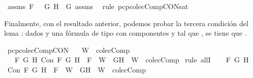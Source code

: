 \begin{isabellebody}
\ assms{\isacharparenleft}{}{\isacharparenright}\ {\isacartoucheopen}F\ {\isacharequal}\ \isactrlbold {\isasymnot}{\isacharparenleft}\isactrlbold {\isasymnot}\ G{\isacharparenright}{\isacartoucheclose}\ {\isacartoucheopen}H\ {\isacharequal}\ G{\isacartoucheclose}\ assms{\isacharparenleft}{}{\isacharcomma}{}{\isacharcomma}{}{\isacharparenright}\ \isamarkupfalse%
\ {\isacharparenleft}rule\ pcp{\isacharunderscore}colecComp{\isacharunderscore}CON{\isacharunderscore}sat{}{\isacharparenright}\isanewline
\ \ \ \ \ \ \isamarkupfalse%
\isanewline
\ \ \ \ \isamarkupfalse%
\isanewline
\ \ \isamarkupfalse%
\isanewline
{}\isamarkupfalse%
%
\endisatagproof
{\isafoldproof}%
%
\isadelimproof
%
\endisadelimproof
%
\begin{isamarkuptext}%
Finalmente, con el resultado anterior, podemos probar la tercera condición del lema : 
  dados  y  una fórmula de tipo \isa{{\isasymalpha}} con componentes  y  tal que , se tiene 
  que .%
\end{isamarkuptext}\isamarkuptrue%
\isamarkupfalse%
\ pcp{\isacharunderscore}colecComp{\isacharunderscore}CON{\isacharcolon}\isanewline
\ \ \ {\isachardoublequoteopen}W\ {\isasymin}\ colecComp{\isachardoublequoteclose}\isanewline
\ \ \ {\isachardoublequoteopen}{\isasymforall}F\ G\ H{\isachardot}\ Con\ F\ G\ H\ {\isasymlongrightarrow}\ F\ {\isasymin}\ W\ {\isasymlongrightarrow}\ {\isacharbraceleft}G{\isacharcomma}H{\isacharbraceright}\ {\isasymunion}\ W\ {\isasymin}\ colecComp{\isachardoublequoteclose}\isanewline
%
\isadelimproof
%
\endisadelimproof
%
\isatagproof
{}\isamarkupfalse%
\ {\isacharparenleft}rule\ allI{\isacharparenright}{\isacharplus}\isanewline
\ \ \isamarkupfalse%
\ F\ G\ H\isanewline
\ \ \isamarkupfalse%
\ {\isachardoublequoteopen}Con\ F\ G\ H\ {\isasymlongrightarrow}\ F\ {\isasymin}\ W\ {\isasymlongrightarrow}\ {\isacharbraceleft}G{\isacharcomma}H{\isacharbraceright}\ {\isasymunion}\ W\ {\isasymin}\ colecComp{\isachardoublequoteclose}\isanewline

\end{isabellebody}
